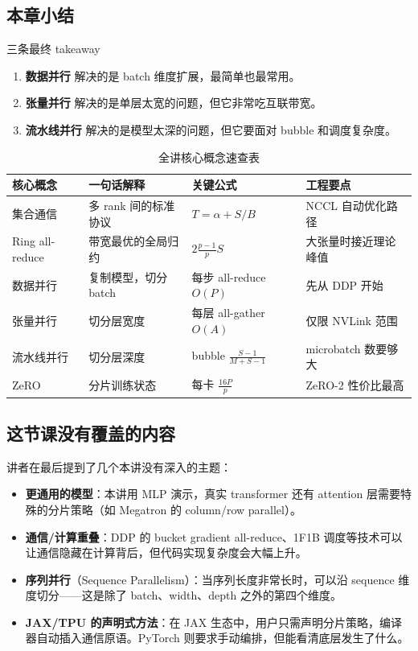 \documentclass[a4paper]{article}
\begin{document}
\subsection{本章小结}

\begin{importantbox}{三条最终 takeaway}
\begin{enumerate}
    \item \textbf{数据并行} 解决的是 batch 维度扩展，最简单也最常用。
    \item \textbf{张量并行} 解决的是单层太宽的问题，但它非常吃互联带宽。
    \item \textbf{流水线并行} 解决的是模型太深的问题，但它要面对 bubble 和调度复杂度。
\end{enumerate}
\end{importantbox}

\begin{table}[H]
\centering
\small
\begin{tabular}{p{3.0cm}p{3.5cm}p{3.0cm}p{3.5cm}}
\toprule
\textbf{核心概念} & \textbf{一句话解释} & \textbf{关键公式} & \textbf{工程要点} \\
\midrule
集合通信 & 多 rank 间的标准协议 & $T = \alpha + S/B$ & NCCL 自动优化路径 \\
Ring all-reduce & 带宽最优的全局归约 & $2\frac{p-1}{p}S$ & 大张量时接近理论峰值 \\
数据并行 & 复制模型，切分 batch & 每步 all-reduce $O(P)$ & 先从 DDP 开始 \\
张量并行 & 切分层宽度 & 每层 all-gather $O(A)$ & 仅限 NVLink 范围 \\
流水线并行 & 切分层深度 & bubble $\frac{S-1}{M+S-1}$ & microbatch 数要够大 \\
ZeRO & 分片训练状态 & 每卡 $\frac{16P}{p}$ & ZeRO-2 性价比最高 \\
\bottomrule
\end{tabular}
\caption{全讲核心概念速查表}
\end{table}

\subsection{这节课没有覆盖的内容}

讲者在最后提到了几个本讲没有深入的主题：

\begin{itemize}
    \item \textbf{更通用的模型}：本讲用 MLP 演示，真实 transformer 还有 attention 层需要特殊的分片策略（如 Megatron 的 column/row parallel）。
    \item \textbf{通信/计算重叠}：DDP 的 bucket gradient all-reduce、1F1B 调度等技术可以让通信隐藏在计算背后，但代码实现复杂度会大幅上升。
    \item \textbf{序列并行}（Sequence Parallelism）：当序列长度非常长时，可以沿 sequence 维度切分——这是除了 batch、width、depth 之外的第四个维度。
    \item \textbf{JAX/TPU 的声明式方法}：在 JAX 生态中，用户只需声明分片策略，编译器自动插入通信原语。PyTorch 则要求手动编排，但能看清底层发生了什么。
\end{itemize}
\end{document}
